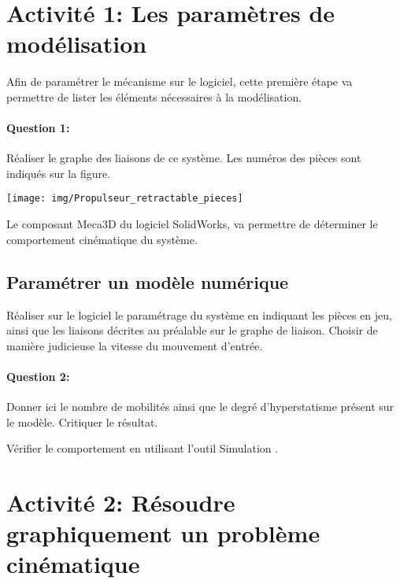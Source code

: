 

\section{Activité 1: Les paramètres de modélisation}

\begin{minipage}{0.45\linewidth}
Afin de paramétrer le mécanisme sur le logiciel, cette première étape va permettre de lister les éléments nécessaires à la modélisation.

\paragraph{Question 1:} Réaliser le graphe des liaisons de ce système. Les numéros des pièces sont indiqués sur la figure. 
\end{minipage}
\hfill
\begin{minipage}{0.48\linewidth}
	\texttt{[image: img/Propulseur\_retractable\_pieces]}
\end{minipage}

\vspace{5cm}

Le composant \og Meca3D \fg du logiciel SolidWorks, va permettre de déterminer le comportement cinématique du système.

\subsection{Paramétrer un modèle numérique}

Réaliser sur le logiciel le paramétrage du système en indiquant les pièces en jeu, ainsi que les liaisons décrites au préalable sur le graphe de liaison. Choisir de manière judicieuse la vitesse du mouvement d'entrée.

\paragraph{Question 2:} Donner ici le nombre de mobilités ainsi que le degré d'hyperstatisme présent sur le modèle. Critiquer le résultat.

\reponse[1]

Vérifier le comportement en utilisant l'outil \og Simulation \fg.

\section{Activité 2: Résoudre graphiquement un problème cinématique}

